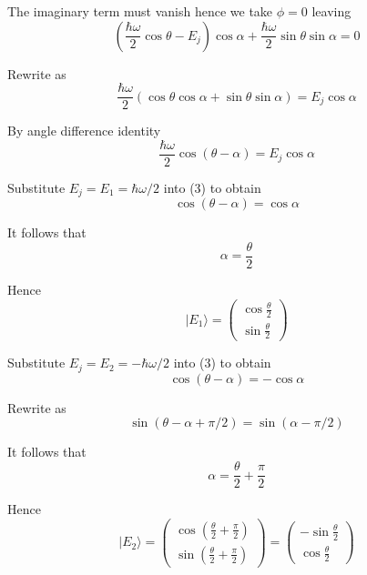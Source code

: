 \documentclass[12pt]{article}
\begin{document}
The imaginary term must vanish hence we take $\phi=0$ leaving
\begin{equation*}
\left(\frac{\hbar\omega}{2}\cos\theta-E_j\right)\cos\alpha+\frac{\hbar\omega}{2}\sin\theta\sin\alpha=0
\end{equation*}

Rewrite as
\begin{equation*}
\frac{\hbar\omega}{2}(\cos\theta\cos\alpha+\sin\theta\sin\alpha)=E_j\cos\alpha
\end{equation*}

By angle difference identity
\begin{equation*}
\frac{\hbar\omega}{2}\cos(\theta-\alpha)=E_j\cos\alpha
\tag{3}
\end{equation*}

Substitute $E_j=E_1=\hbar\omega/2$ into (3) to obtain
\begin{equation*}
\cos(\theta-\alpha)=\cos\alpha
\end{equation*}

It follows that
\begin{equation*}
\alpha=\frac{\theta}{2}
\end{equation*}

Hence
\begin{equation*}
|E_1\rangle=\begin{pmatrix}\cos\frac{\theta}{2}\\[1ex]\sin\frac{\theta}{2}\end{pmatrix}
\end{equation*}

Substitute $E_j=E_2=-\hbar\omega/2$ into (3) to obtain
\begin{equation*}
\cos(\theta-\alpha)=-\cos\alpha
\end{equation*}

Rewrite as
\begin{equation*}
\sin(\theta-\alpha+\pi/2)=\sin(\alpha-\pi/2)
\end{equation*}

It follows that
\begin{equation*}
\alpha=\frac{\theta}{2}+\frac{\pi}{2}
\end{equation*}

Hence
\begin{equation*}
|E_2\rangle=\begin{pmatrix}\cos\left(\frac{\theta}{2}+\frac{\pi}{2}\right)
\\[1ex]
\sin\left(\frac{\theta}{2}+\frac{\pi}{2}\right)
\end{pmatrix}
=\begin{pmatrix}
-\sin\frac{\theta}{2}
\\[1ex]
\cos\frac{\theta}{2}
\end{pmatrix}
\end{equation*}
\end{document}

